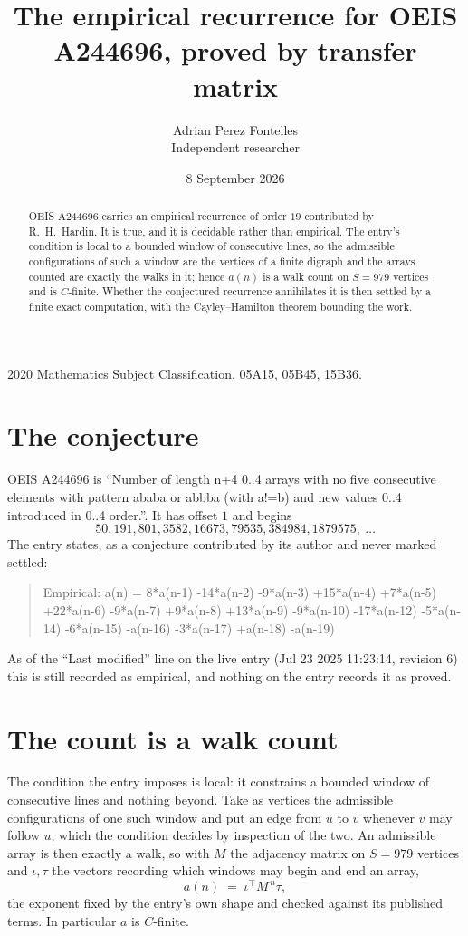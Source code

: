 \documentclass[11pt,a4paper]{article}
\title{The empirical recurrence for OEIS A244696, proved by transfer matrix}
\author{Adrian Perez Fontelles\\ \small Independent researcher}
\date{8 September 2026}
\theoremstyle{plain}
\theoremstyle{definition}
\begin{document}
\maketitle

\begin{abstract}
OEIS A244696 carries an empirical recurrence of order $19$ contributed by R.~H.~Hardin. It is
true, and it is decidable rather than empirical. The entry's condition is local to a bounded window of consecutive lines, so
the admissible configurations of such a window are the vertices of a finite digraph and the
arrays counted are exactly the walks in it; hence $a(n)$ is a walk count on $S=979$ vertices
and is $C$-finite. Whether the conjectured recurrence annihilates it is then settled by a
finite exact computation, with the Cayley--Hamilton theorem bounding the work.
\end{abstract}

\noindent\small 2020 Mathematics Subject Classification. 05A15, 05B45, 15B36.\normalsize

\section{The conjecture}

OEIS A244696 is ``Number of length n+4 0..4 arrays with no five consecutive elements with pattern ababa or abbba (with a!=b) and new values 0..4 introduced in 0..4 order.''. It has offset $1$ and begins
\[
50, 191, 801, 3582, 16673, 79535, 384984, 1879575,\ \dots
\]
The entry states, as a conjecture contributed by its author and never marked settled:
\begin{quote}
Empirical: a(n) = 8*a(n-1) -14*a(n-2) -9*a(n-3) +15*a(n-4) +7*a(n-5) +22*a(n-6) -9*a(n-7) +9*a(n-8) +13*a(n-9) -9*a(n-10) -17*a(n-12) -5*a(n-14) -6*a(n-15) -a(n-16) -3*a(n-17) +a(n-18) -a(n-19)
\end{quote}
As of the ``Last modified'' line on the live entry (Jul 23 2025 11:23:14, revision 6) this is still
recorded as empirical, and nothing on the entry records it as proved.

\section{The count is a walk count}

The condition the entry imposes is local: it constrains a bounded window of consecutive lines and nothing beyond. Take as
vertices the admissible configurations of one such window and put an edge from $u$ to $v$
whenever $v$ may follow $u$, which the condition decides by inspection of the two. An
admissible array is then exactly a walk, so with $M$ the adjacency matrix on $S=979$ vertices
and $\iota,\tau$ the vectors recording which windows may begin and end an array,
\[
a(n)\;=\;\iota^{\!\top}M^{\,n}\tau ,
\]
the exponent fixed by the entry's own shape and checked against its published terms. In
particular $a$ is $C$-finite.
\end{document}
